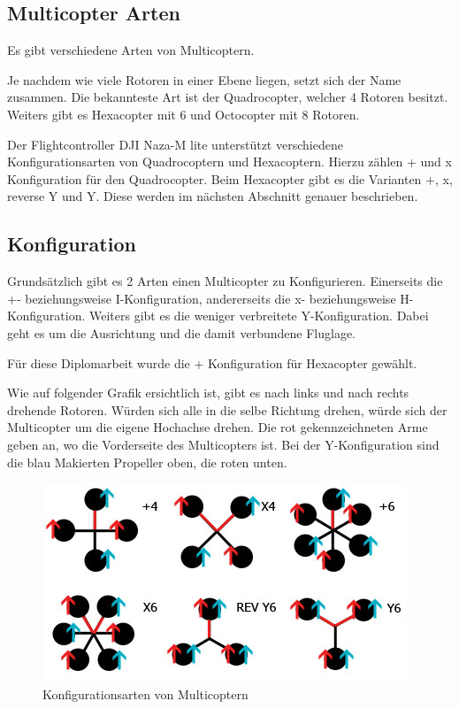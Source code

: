   \subsection{Multicopter Arten}
  Es gibt verschiedene Arten von Multicoptern\cite{GrundlagenMulticopter}.

  Je nachdem wie viele Rotoren in einer Ebene liegen, setzt sich der Name zusammen.
  Die bekannteste Art ist der Quadrocopter, welcher 4 Rotoren besitzt. Weiters gibt es Hexacopter mit 6 und Octocopter mit 8 Rotoren.

  Der Flightcontroller DJI Naza-M lite unterstützt verschiedene Konfigurationsarten\cite{NAZA_Konfig} von Quadrocoptern und Hexacoptern. Hierzu zählen + und x Konfiguration für den Quadrocopter. Beim Hexacopter gibt es die Varianten +, x, reverse Y und Y. Diese werden im nächsten Abschnitt genauer beschrieben. 

  \subsection{Konfiguration}
  Grundsätzlich gibt es 2 Arten einen Multicopter zu Konfigurieren. \cite{GrundlagenMulticopter}
  Einerseits die +- beziehungsweise I-Konfiguration, andererseits die x- beziehungsweise H-Konfiguration. Weiters gibt es die weniger verbreitete Y-Konfiguration. Dabei geht es um die Ausrichtung und die damit verbundene Fluglage.

  Für diese Diplomarbeit wurde die + Konfiguration für Hexacopter gewählt.

  Wie auf folgender Grafik\cite{NAZA_Konfig} ersichtlich ist, gibt es nach links und nach rechts drehende Rotoren. Würden sich alle in die selbe Richtung drehen, würde sich der Multicopter um die eigene Hochachse drehen. Die rot gekennzeichneten Arme geben an, wo die Vorderseite des Multicopters ist. Bei der Y-Konfiguration sind die blau Makierten Propeller oben, die roten unten. 

    \begin{figure}[H]
      \begin{centering}
        \includegraphics[width = \textwidth]{Bilder/bor_copter_konfig}
      \par\end{centering}
      \caption{Konfigurationsarten von Multicoptern}
      \label{Flussdiragramm}
    \end{figure}

